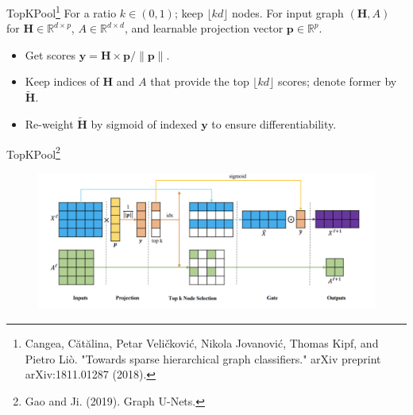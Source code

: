 \documentclass{beamer}
\begin{document}
\begin{frame}{TopKPool\footnote{Cangea, Cătălina, Petar Veličković, Nikola Jovanović, Thomas Kipf, and Pietro Liò. "Towards sparse hierarchical graph classifiers." arXiv preprint arXiv:1811.01287 (2018).}}
For a ratio $k\in(0,1)$; keep $\lfloor{kd}\rfloor$ nodes. For input graph $(\mathbf{H},A)$ for $\mathbf{H}\in\mathbb{R}^{d\times p}$, $A\in\mathbb{R}^{d\times d}$, and learnable projection vector $\mathbf{p}\in\mathbb{R}^p$. 
\begin{itemize}
\item Get scores $\mathbf{y}=\mathbf{H}\times\mathbf{p}/\|\mathbf{p}\|$.
\item  Keep indices of $\mathbf{H}$ and $A$ that provide the top $\lfloor{kd}\rfloor$ scores; denote former by $\tilde{\mathbf{H}}$.
\item  Re-weight $\tilde{\mathbf{H}}$ by sigmoid of indexed $\mathbf{y}$ to ensure differentiability.
\end{itemize}

\end{frame}
\begin{frame}{TopKPool\footnote{Gao and Ji. (2019).
Graph U-Nets.}}
\begin{figure}
\includegraphics[width=0.95\linewidth]{Images/TopKpool.png}
\end{figure}
\end{frame}
\end{document}

